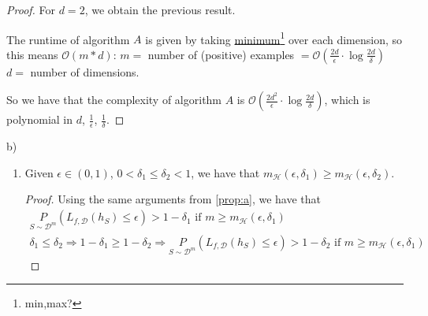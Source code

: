 \documentclass{article}
\newcommand{\<}{\langle}
\renewcommand{\>}{\rangle}
\theoremstyle{definition}
\def\gD{{\mathcal{D}}}
\def\gH{{\mathcal{H}}}
\def\gO{{\mathcal{O}}}
\newcommand{\uset}{\underset}
\newcommand{\izo}{(0, 1)}
\newcommand{\epd}{(\epsilon, \delta)}
\newcommand{\mgh}{m_{\gH}}
\newcommand{\psdm}{\uset{S \sim \gD^m}{P}}
\newcommand{\lfd}{L_{f, \gD}}
\newcommand{\hs}{h_S}
\newcommand{\uset}{\underset}
\newcommand{\izo}{(0, 1)}
\newcommand{\epd}{(\epsilon, \delta)}
\newcommand{\mgh}{m_{\gH}}
\newcommand{\psdm}{\uset{S \sim \gD^m}{P}}
\newcommand{\lfd}{L_{f, \gD}}
\newcommand{\hs}{h_S}
\begin{document}
\begin{proof}
\noindent For $d = 2$, we obtain the previous result.

The runtime of algorithm $A$ is given by taking  \underline{minimum}\footnote{min,max?} over each dimension, so this means $\gO(m*d)$: $m = $ number of (positive) examples
$ = \gO(\frac{2d}{\epsilon} \cdot \log \frac{2d}{\delta})$ \\
$d = $ number of dimensions.

So we have that the complexity of algorithm $A$ is $\gO(\frac{2d^2}{\epsilon} \cdot \log \frac{2d}{\delta})$, which is polynomial in $d$, $\frac{1}{\epsilon}$, $\frac{1}{\delta}$.

\end{proof}

b) 

\begin{enumerate}[label=\alph*)]

\begin{proof}
$\gH$ is PAC-learnable with sample complexity $\mgh(\cdot, \cdot)$ means that there exists
a learning algorithm $A$ with the following property: for every $\epsilon, \delta > 0$, when
we run the algorithm $A$ on a sample set $S$ of $m$ examples, $m \geq \mgh\epd$
(samples are labeled by $f \in \gH$ and i.i.d.\ from a distribution $\gD$), we have that
$\hs = A(S)$ with the real risk $\psdm(\lfd(\hs) \leq \epsilon) > 1-\delta$.

We apply this for $\epsilon_1$ and $\delta$:
\[\psdm(\lfd(\hs) \leq \epsilon_1) > 1-\delta
\text{ if } m \geq \mgh(\epsilon_1, \delta)\]

We know that $\epsilon_2 \geq \epsilon_1$, so we have that
\[\psdm(\lfd(\hs) \leq \epsilon_2) > 1-\delta \text{ if } m \geq \mgh(\epsilon_1, \delta)\]

But $\mgh(\epsilon_2, \delta)$ is the smallest number of examples for which the above inequality
holds. So, if it holds for $m \geq \mgh(\epsilon_1, \delta)$, we have that
$\mgh(\epsilon_1, \delta) \geq \mgh(\epsilon_2, \delta)$.
\end{proof}

  \item Given $\epsilon \in \izo$, $0 < \delta_1 \leq \delta_2 < 1$, we have that
  $\mgh(\epsilon, \delta_1) \geq \mgh(\epsilon, \delta_2)$.
  \begin{proof}
  Using the same arguments from \ref{prop:a}, we have that
  \begin{align*}
    \psdm(\lfd(\hs) \leq \epsilon) > 1-\delta_1 \text{ if } m \geq \mgh(\epsilon, \delta_1) \\
    \delta_1 \leq \delta_2 \Rightarrow 1-\delta_1 \geq 1-\delta_2 \Rightarrow 
    \psdm(\lfd(\hs) \leq \epsilon) > 1-\delta_2 \text{ if } m \geq \mgh(\epsilon, \delta_1)
  \end{align*}
  

\end{proof}
\end{enumerate}
\end{document}
